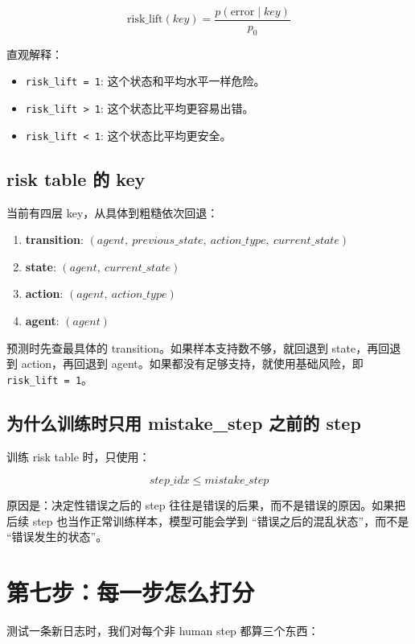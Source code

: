 \documentclass[UTF8,a4paper,11pt]{ctexart}
\begin{document}
\[
\text{risk\_lift}(key)
=
\frac{p(\text{error}\mid key)}{p_0}
\]

直观解释：

\begin{itemize}
  \item \texttt{risk\_lift = 1}: 这个状态和平均水平一样危险。
  \item \texttt{risk\_lift > 1}: 这个状态比平均更容易出错。
  \item \texttt{risk\_lift < 1}: 这个状态比平均更安全。
\end{itemize}

\subsection{risk table 的 key}

当前有四层 key，从具体到粗糙依次回退：

\begin{enumerate}
  \item \textbf{transition}: \((agent,\ previous\_state,\ action\_type,\ current\_state)\)
  \item \textbf{state}: \((agent,\ current\_state)\)
  \item \textbf{action}: \((agent,\ action\_type)\)
  \item \textbf{agent}: \((agent)\)
\end{enumerate}

预测时先查最具体的 transition。如果样本支持数不够，就回退到 state，再回退到 action，再回退到 agent。如果都没有足够支持，就使用基础风险，即 \texttt{risk\_lift = 1}。

\subsection{为什么训练时只用 mistake\_step 之前的 step}

训练 risk table 时，只使用：

\[
step\_idx \leq mistake\_step
\]

原因是：决定性错误之后的 step 往往是错误的后果，而不是错误的原因。如果把后续 step 也当作正常训练样本，模型可能会学到 ``错误之后的混乱状态''，而不是 ``错误发生的状态''。

\section{第七步：每一步怎么打分}

测试一条新日志时，我们对每个非 human step 都算三个东西：
\end{document}
